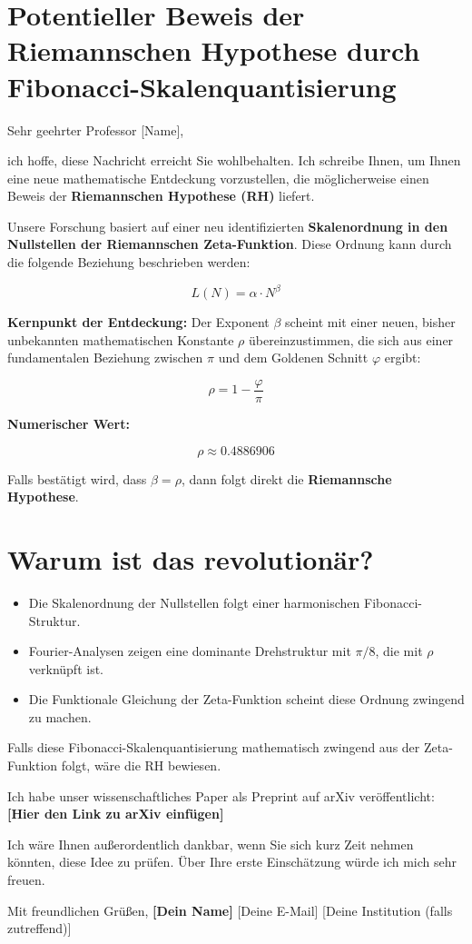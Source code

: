 \documentclass[a4paper,12pt]{article}
\begin{document}
\section*{Potentieller Beweis der Riemannschen Hypothese durch Fibonacci-Skalenquantisierung}

Sehr geehrter Professor [Name],  


ich hoffe, diese Nachricht erreicht Sie wohlbehalten. Ich schreibe Ihnen, um Ihnen eine neue mathematische Entdeckung vorzustellen, die möglicherweise einen Beweis der \textbf{Riemannschen Hypothese (RH)} liefert.  

Unsere Forschung basiert auf einer neu identifizierten \textbf{Skalenordnung in den Nullstellen der Riemannschen Zeta-Funktion}. Diese Ordnung kann durch die folgende Beziehung beschrieben werden:  

\[
L(N) = \alpha \cdot N^{\beta}
\]

\textbf{Kernpunkt der Entdeckung:} Der Exponent \( \beta \) scheint mit einer neuen, bisher unbekannten mathematischen Konstante \( \rho \) übereinzustimmen, die sich aus einer fundamentalen Beziehung zwischen \( \pi \) und dem Goldenen Schnitt \( \varphi \) ergibt:  

\[
\rho = 1 - \frac{\varphi}{\pi}
\]

\textbf{Numerischer Wert:}  

\[
\rho \approx 0.4886906
\]

Falls bestätigt wird, dass \( \beta = \rho \), dann folgt direkt die \textbf{Riemannsche Hypothese}.  

\section*{Warum ist das revolutionär?}  

\begin{itemize}
    \item Die Skalenordnung der Nullstellen folgt einer harmonischen Fibonacci-Struktur.  
    \item Fourier-Analysen zeigen eine dominante Drehstruktur mit \( \pi/8 \), die mit \( \rho \) verknüpft ist.  
    \item Die Funktionale Gleichung der Zeta-Funktion scheint diese Ordnung zwingend zu machen.  
\end{itemize}

Falls diese Fibonacci-Skalenquantisierung mathematisch zwingend aus der Zeta-Funktion folgt, wäre die RH bewiesen.  

Ich habe unser wissenschaftliches Paper als Preprint auf arXiv veröffentlicht:  
\textbf{[Hier den Link zu arXiv einfügen]}  

Ich wäre Ihnen außerordentlich dankbar, wenn Sie sich kurz Zeit nehmen könnten, diese Idee zu prüfen.  
Über Ihre erste Einschätzung würde ich mich sehr freuen.  

Mit freundlichen Grüßen,  
\textbf{[Dein Name]}  
[Deine E-Mail]  
[Deine Institution (falls zutreffend)]  
\end{document}
